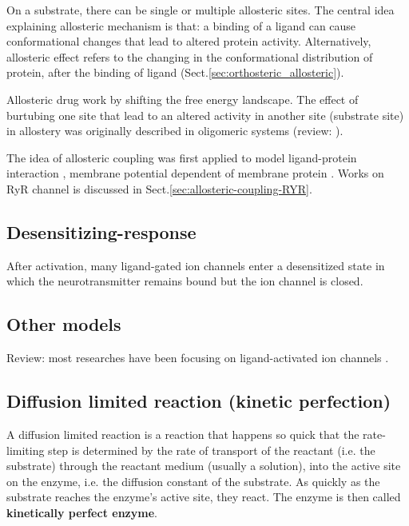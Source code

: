 On a substrate, there can be single or multiple allosteric sites. The central
idea explaining allosteric mechanism is that: a binding of a ligand can cause
conformational changes that lead to altered protein activity.
Alternatively, allosteric effect refers to the changing in the conformational
distribution of protein, after the binding of ligand \citep{ming2005}
(Sect.\ref{sec:orthosteric_allosteric}).

Allosteric drug work by shifting the free energy landscape. The effect of
burtubing one site that lead to an altered activity in another site (substrate
site) in allostery was originally described in oligomeric systems
(review: \citep{changeux2005}).

The idea of allosteric coupling was first applied to model ligand-protein
interaction \citep{monod1965nat}, membrane potential dependent of membrane
protein \citep{stevens1978}. Works on RyR channel is discussed in
Sect.\ref{sec:allosteric-coupling-RYR}.

\subsection{Desensitizing-response}
\label{sec:desensitizing-response}

After activation, many ligand-gated ion channels enter a desensitized state in
which  the  neurotransmitter  remains  bound  but the  ion  channel  is  closed.

\subsection{Other models}

Review: most researches have been focusing on ligand-activated ion channels
\citep{colquhoun2002}.

\subsection{Diffusion limited reaction (kinetic perfection)}
\label{sec:diffusion-limited-reaction}

A diffusion limited reaction is a reaction that happens so quick that the
rate-limiting step is determined by the rate of transport of the
reactant (i.e. the substrate) through the reactant medium (usually a solution),
into the active site on the enzyme, i.e. the diffusion constant of the
substrate. As quickly as the substrate reaches the enzyme's active site, they react.
The enzyme is then called {\bf kinetically perfect enzyme}.

